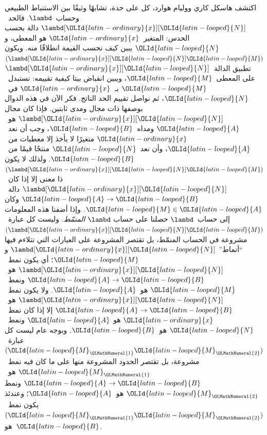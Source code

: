 \documentclass[../../../include/open-logic-section]{subfiles}
\begin{document}
اكتشف هاسكل كاري ووليام هوارد، كل على حدة، تشابهًا وثيقًا بين الاستنباط
الطبيعي وحساب~$\lambd$. فالحد~$\lambd[{\OLId{latin-ordinary}{x}}][{\OLId{latin-looped}{N}}]$ دالة بحسب الحدس: المتغير~${\OLId{latin-ordinary}{x}}$
هو المعطى، و${\OLId{latin-looped}{N}}$ يبين كيف نحسب القيمة انطلاقًا منه. ويكون
$(\lambd[{\OLId{latin-ordinary}{x}}][{\OLId{latin-looped}{N}}]{\OLId{latin-looped}{M}})$ تطبيق الدالة~$\lambd[{\OLId{latin-ordinary}{x}}][{\OLId{latin-looped}{N}}]$ على المعطى~${\OLId{latin-looped}{M}}$، ويبين
انقباض بيتا كيفية تقييمه: نستبدل~${\OLId{latin-looped}{M}}$ بـ~${\OLId{latin-ordinary}{x}}$ في~${\OLId{latin-looped}{N}}$، ثم نواصل تقييم الحد
الناتج. فكر الآن في هذه الدوال بوصفها ذات مجال ومدى ثابتين. فإذا كان مجال
$\lambd[{\OLId{latin-ordinary}{x}}][{\OLId{latin-looped}{N}}]$ هو~${\OLId{latin-looped}{A}}$ ومداه~${\OLId{latin-looped}{B}}$، وجب أن نعد~${\OLId{latin-ordinary}{x}}$ متغيرًا لا يأخذ إلا
معطيات من~${\OLId{latin-looped}{A}}$، وأن نعد~${\OLId{latin-looped}{N}}$ منتجًا قيمًا من~${\OLId{latin-looped}{B}}$. ولذلك لا يكون
$(\lambd[{\OLId{latin-ordinary}{x}}][{\OLId{latin-looped}{N}}]{\OLId{latin-looped}{M}})$ ذا معنى إلا إذا كان~$\lambd[{\OLId{latin-ordinary}{x}}][{\OLId{latin-looped}{N}}]$ دالة~${\OLId{latin-looped}{A}}\to {\OLId{latin-looped}{B}}$ وكان
${\OLId{latin-looped}{M}}\in {\OLId{latin-looped}{A}}$. وإذا أضفنا هذه المعلومات إلى حساب~$\lambd$ حصلنا على حساب
$\lambd$ \emph{المنمّط}. وليست كل عبارة~$(\lambd[{\OLId{latin-ordinary}{x}}][{\OLId{latin-looped}{N}}]{\OLId{latin-looped}{M}})$ مشروعة في
الحساب المنمّط، بل تقتصر المشروعة على العبارات التي تتلاءم فيها ``أنماط''
$\lambd[{\OLId{latin-ordinary}{x}}][{\OLId{latin-looped}{N}}]$ و${\OLId{latin-looped}{M}}$؛ أي يكون نمط~$\lambd[{\OLId{latin-ordinary}{x}}][{\OLId{latin-looped}{N}}]$ هو~${\OLId{latin-looped}{A}}\to {\OLId{latin-looped}{B}}$ ونمط~${\OLId{latin-looped}{M}}$
هو~${\OLId{latin-looped}{A}}$. ولا يكون نمط~$\lambd[{\OLId{latin-ordinary}{x}}][{\OLId{latin-looped}{N}}]$ هو~${\OLId{latin-looped}{A}}\to {\OLId{latin-looped}{B}}$ إلا إذا كان نمط~${\OLId{latin-ordinary}{x}}$ هو
${\OLId{latin-looped}{A}}$ ونمط~${\OLId{latin-looped}{N}}$ هو~${\OLId{latin-looped}{B}}$. وبوجه عام ليست كل عبارة~$({\OLId{latin-looped}{M}}_{\OLMathNumeral{1}}{\OLId{latin-looped}{M}}_{\OLMathNumeral{2}})$ مشروعة، بل
تقتصر الحدود المشروعة منها على ما كان فيه نمط~${\OLId{latin-looped}{M}}_{\OLMathNumeral{1}}$ هو~${\OLId{latin-looped}{A}}\to {\OLId{latin-looped}{B}}$ ونمط
${\OLId{latin-looped}{M}}_{\OLMathNumeral{2}}$ هو~${\OLId{latin-looped}{A}}$؛ وعندئذ يكون نمط~$({\OLId{latin-looped}{M}}_{\OLMathNumeral{1}}{\OLId{latin-looped}{M}}_{\OLMathNumeral{2}})$ هو~${\OLId{latin-looped}{B}}$.
\end{document}

